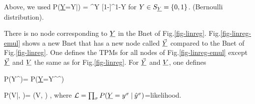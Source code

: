 Above, we used 
\beq
P(\ul{Y}=Y|\haty) = \haty^{Y}
[1-\haty]^{1-Y}
\eeq
for $Y\in S_{\underline{Y}}=\{0,1\}$. (Bernoulli distribution).

There is no node corresponding to $\underline{Y}$
in the Bnet of Fig.\ref{fig-linreg}.
Fig.\ref{fig-linreg-emul} shows a new Bnet
that has a new node called $\vec{\underline{Y}}$
compared to the Bnet of Fig.\ref{fig-linreg}.
One defines the TPMs
for all nodes of Fig.\ref{fig-linreg-emul}
except $\vec{\underline{Y}}$ and $\underline{V}$ the same
as for Fig.\ref{fig-linreg}. For $\vec{\underline{Y}}$
and $\underline{V}$, one defines

\beq\color{blue}
P(Y^\s\cond \vec{\haty})=
P(\ul{Y}=Y^\s\cond \haty^\s)
\eeq

\beq\color{blue}
P(V|, \vecy)=
\delta(V, \ln \call)
\;,
\eeq
where ${\cal L} =\prod_\sigma P(\underline{Y}=y^\sigma{\:\mathbf{|}\:} {\hat{y}}^\sigma )$=likelihood.


